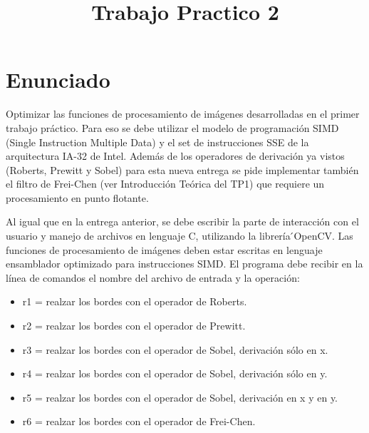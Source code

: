 \documentclass[a4paper, 10pt]{article}
\title{Trabajo Practico 2}
\begin{document}
\maketitle
\newpage

\tableofcontents

\newpage

\section{Enunciado}

Optimizar las funciones de procesamiento de im\'agenes desarrolladas en el primer trabajo pr\'actico. Para eso se debe utilizar el modelo de programaci\'on SIMD (Single Instruction Multiple Data) y el set de instrucciones SSE de la arquitectura IA-32 de Intel. Adem\'as de los operadores de derivaci\'on ya vistos (Roberts, Prewitt y Sobel) para esta nueva entrega se pide implementar tambi\'en el filtro de Frei-Chen (ver Introducci\'on Te\'orica del TP1) que requiere un procesamiento en punto flotante.

Al igual que en la entrega anterior, se debe escribir la parte de interacci\'on con el usuario y manejo de archivos en lenguaje C, utilizando la librer\'ia ́OpenCV. Las funciones de procesamiento de im\'agenes deben estar escritas en lenguaje ensamblador optimizado para instrucciones SIMD. El programa debe recibir en la l\'inea de comandos el nombre del archivo de entrada y la operaci\'on:

\begin{itemize}
\item r1 = realzar los bordes con el operador de Roberts.
\item r2 = realzar los bordes con el operador de Prewitt. 
\item r3 = realzar los bordes con el operador de Sobel, derivaci\'on s\'olo en x.
\item r4 = realzar los bordes con el operador de Sobel, derivaci\'on s\'olo en y.
\item r5 = realzar los bordes con el operador de Sobel, derivaci\'on en x y en y.
\item r6 = realzar los bordes con el operador de Frei-Chen.
\end{itemize}
\end{document}
